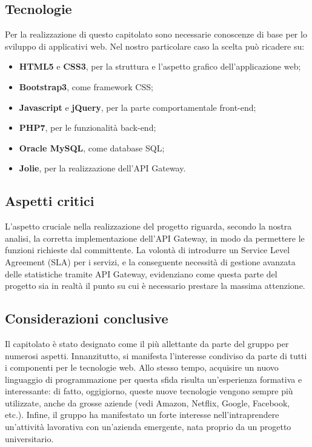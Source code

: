 \subsection{Tecnologie}

Per la realizzazione di questo capitolato sono necessarie conoscenze di base per lo sviluppo di applicativi web. Nel nostro particolare caso la scelta può ricadere su:
\begin{itemize}
	\item \textbf{HTML5} e \textbf{CSS3}, per la struttura e l'aspetto grafico dell'applicazione web;
	\item \textbf{Bootstrap3}, come framework CSS;
	\item \textbf{Javascript} e \textbf{jQuery}, per la parte comportamentale front-end;
	\item \textbf{PHP7}, per le funzionalità back-end;
	\item \textbf{Oracle MySQL}, come database SQL;
	\item \textbf{Jolie}, per la realizzazione dell'API Gateway.
\end{itemize}

\subsection{Aspetti critici}

L'aspetto cruciale nella realizzazione del progetto riguarda, secondo la nostra analisi, la corretta implementazione dell'API Gateway, in modo da permettere le funzioni
richieste dal committente. La volontà di introdurre un Service Level
Agreement (SLA) per i servizi, e la conseguente necessità di gestione
avanzata delle statistiche tramite API Gateway, evidenziano come questa
parte del progetto sia in realtà il punto su cui è necessario prestare la massima attenzione.

\subsection{Considerazioni conclusive}

Il capitolato è stato designato come il più allettante da parte del gruppo per numerosi aspetti. Innanzitutto, si manifesta
l'interesse condiviso da parte di tutti i componenti per le tecnologie web. Allo stesso tempo, acquisire un nuovo linguaggio
di programmazione per questa sfida risulta un'esperienza
formativa e interessante: di fatto, oggigiorno, queste nuove tecnologie vengono sempre più utilizzate, anche da grosse aziende (vedi Amazon, Netflix, Google, Facebook, etc.). Infine, il gruppo ha manifestato un forte interesse nell'intraprendere un'attività lavorativa con un'azienda emergente, nata proprio da un progetto universitario.